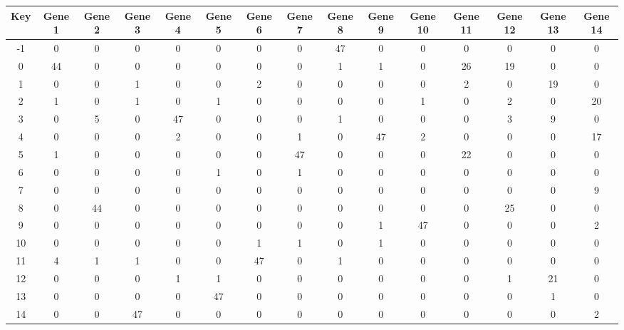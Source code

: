\begin{tabular}{|c|c|c|c|c|c|c|c|c|c|c|c|c|c|c|}
\hline
Key & Gene 1 & Gene 2 & Gene 3 & Gene 4 & Gene 5 & Gene 6 & Gene 7 & Gene 8 & Gene 9 & Gene 10 & Gene 11 & Gene 12 & Gene 13 & Gene 14 \\
\hline
-1 & 0 & 0 & 0 & 0 & 0 & 0 & 0 & 47 & 0 & 0 & 0 & 0 & 0 & 0 \\
0 & 44 & 0 & 0 & 0 & 0 & 0 & 0 & 1 & 1 & 0 & 26 & 19 & 0 & 0 \\
1 & 0 & 0 & 1 & 0 & 0 & 2 & 0 & 0 & 0 & 0 & 2 & 0 & 19 & 0 \\
2 & 1 & 0 & 1 & 0 & 1 & 0 & 0 & 0 & 0 & 1 & 0 & 2 & 0 & 20 \\
3 & 0 & 5 & 0 & 47 & 0 & 0 & 0 & 1 & 0 & 0 & 0 & 3 & 9 & 0 \\
4 & 0 & 0 & 0 & 2 & 0 & 0 & 1 & 0 & 47 & 2 & 0 & 0 & 0 & 17 \\
5 & 1 & 0 & 0 & 0 & 0 & 0 & 47 & 0 & 0 & 0 & 22 & 0 & 0 & 0 \\
6 & 0 & 0 & 0 & 0 & 1 & 0 & 1 & 0 & 0 & 0 & 0 & 0 & 0 & 0 \\
7 & 0 & 0 & 0 & 0 & 0 & 0 & 0 & 0 & 0 & 0 & 0 & 0 & 0 & 9 \\
8 & 0 & 44 & 0 & 0 & 0 & 0 & 0 & 0 & 0 & 0 & 0 & 25 & 0 & 0 \\
9 & 0 & 0 & 0 & 0 & 0 & 0 & 0 & 0 & 1 & 47 & 0 & 0 & 0 & 2 \\
10 & 0 & 0 & 0 & 0 & 0 & 1 & 1 & 0 & 1 & 0 & 0 & 0 & 0 & 0 \\
11 & 4 & 1 & 1 & 0 & 0 & 47 & 0 & 1 & 0 & 0 & 0 & 0 & 0 & 0 \\
12 & 0 & 0 & 0 & 1 & 1 & 0 & 0 & 0 & 0 & 0 & 0 & 1 & 21 & 0 \\
13 & 0 & 0 & 0 & 0 & 47 & 0 & 0 & 0 & 0 & 0 & 0 & 0 & 1 & 0 \\
14 & 0 & 0 & 47 & 0 & 0 & 0 & 0 & 0 & 0 & 0 & 0 & 0 & 0 & 2 \\
\hline
\end{tabular}